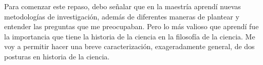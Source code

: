 Para comenzar este repaso, debo señalar que en la maestría aprendí nuevas metodologías de investigación, además de diferentes maneras de plantear y entender las preguntas que me preocupaban.
Pero lo más valioso que aprendí fue la importancia que tiene la historia de la ciencia en la filosofía de la ciencia.
Me voy a permitir hacer una breve caracterización, exageradamente general, de dos posturas en historia de la ciencia.
